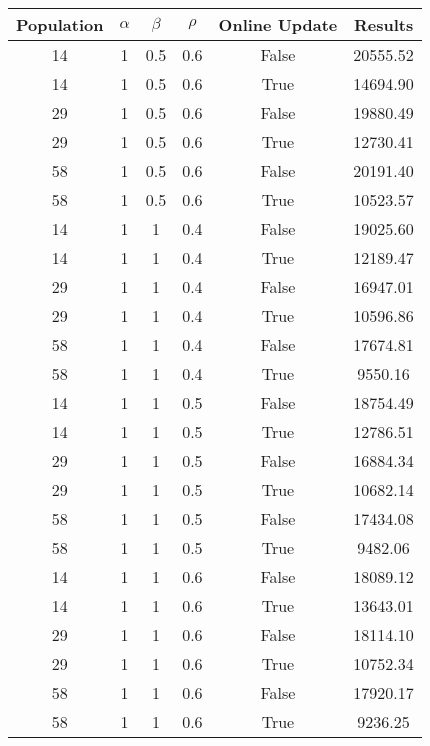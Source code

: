 \documentclass[12pt]{article}
\begin{document}
\begin{table}[h!]
\centering
\begin{tabular}{|c|c|c|c|c|c|}
\textbf{Population} & $\alpha$ & $\beta$ & $\rho$ & \textbf{Online Update} & \textbf{Results} \\ \hline
\hline
14  &  1  &  0.5  &  0.6  &  False  &  20555.52\\ \hline
14  &  1  &  0.5  &  0.6  &  True  &  14694.90\\ \hline
29  &  1  &  0.5  &  0.6  &  False  &  19880.49\\ \hline
29  &  1  &  0.5  &  0.6  &  True  &  12730.41\\ \hline
58  &  1  &  0.5  &  0.6  &  False  &  20191.40\\ \hline
58  &  1  &  0.5  &  0.6  &  True  &  10523.57\\ \hline
14  &  1  &  1  &  0.4  &  False  &  19025.60\\ \hline
14  &  1  &  1  &  0.4  &  True  &  12189.47\\ \hline
29  &  1  &  1  &  0.4  &  False  &  16947.01\\ \hline
29  &  1  &  1  &  0.4  &  True  &  10596.86\\ \hline
58  &  1  &  1  &  0.4  &  False  &  17674.81\\ \hline
58  &  1  &  1  &  0.4  &  True  &  9550.16\\ \hline
14  &  1  &  1  &  0.5  &  False  &  18754.49\\ \hline
14  &  1  &  1  &  0.5  &  True  &  12786.51\\ \hline
29  &  1  &  1  &  0.5  &  False  &  16884.34\\ \hline
29  &  1  &  1  &  0.5  &  True  &  10682.14\\ \hline
58  &  1  &  1  &  0.5  &  False  &  17434.08\\ \hline
58  &  1  &  1  &  0.5  &  True  &  9482.06\\ \hline
14  &  1  &  1  &  0.6  &  False  &  18089.12\\ \hline
14  &  1  &  1  &  0.6  &  True  &  13643.01\\ \hline
29  &  1  &  1  &  0.6  &  False  &  18114.10\\ \hline
29  &  1  &  1  &  0.6  &  True  &  10752.34\\ \hline
58  &  1  &  1  &  0.6  &  False  &  17920.17\\ \hline
58  &  1  &  1  &  0.6  &  True  &  9236.25\\ \hline
\end{tabular}
\end{table}
\end{document}
